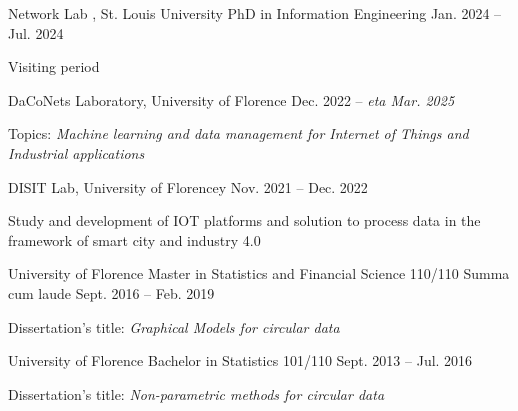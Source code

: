 \begin{cventries}
 \cventry
    {Network Lab , St. Louis University}
    { PhD in Information Engineering}
    {}
    { Jan. 2024 –   Jul. 2024 }
    {
    \begin{cvitems}
        \item { Visiting period
        }
       \end{cvitems}
         }
     \cventry
    {DaCoNets Laboratory, University of Florence}
    { }
    {}
    { Dec. 2022 –  \textit{eta Mar. 2025} }
    {
      \begin{cvitems}
        \item {Topics: \textit{Machine learning and data management for Internet of Things and Industrial applications}}
       \end{cvitems}
    }
  \cventry
    {DISIT Lab, University of Florencey}
    { }
    {}
    { Nov. 2021 –   Dec. 2022 }
    {
    \begin{cvitems}
        { \item {Study and development of IOT platforms and solution to process data in the framework of
smart city and industry 4.0}
        }
       \end{cvitems}
         }
  \cventry
    {University of Florence}
    {Master in Statistics and Financial Science}
    {110/110 Summa cum laude}
    { Sept. 2016 – Feb. 2019}
    {
      \begin{cvitems}
        \item {Dissertation’s title: \textit{Graphical Models for circular data}}
       \end{cvitems}
    }
    
  \cventry
    {University of Florence}
    {Bachelor in Statistics }
    {101/110}
    {Sept. 2013 – Jul. 2016}
    {
      \begin{cvitems}
        \item {Dissertation’s title: \textit{Non-parametric methods for circular data}}
      \end{cvitems}
    }
\end{cventries}
